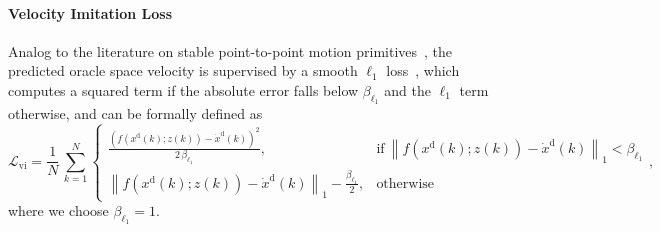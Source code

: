 \paragraph{Velocity Imitation Loss}
Analog to the literature on stable point-to-point motion primitives~\citep{rana2020euclideanizing}, the predicted oracle space velocity is supervised by a smooth $\ell_1$ loss~\citep{girshick2015fast}, which computes a squared term if the absolute error falls below $\beta_{\ell_1}$ and the $\ell_1$ term otherwise, and can be formally defined as
\begin{equation}
    \mathcal{L}_\mathrm{vi} = \frac{1}{N} \, \sum_{k = 1}^{N} \begin{cases}
		\frac{\left ( f(x^\mathrm{d}(k);z(k)) - \dot{x}^\mathrm{d}(k) \right )^2}{2 \, \beta_{\ell_1}}, & \text{if} \: \left \lVert f(x^\mathrm{d}(k);z(k)) - \dot{x}^\mathrm{d}(k) \right \rVert_1 < \beta_{\ell_1} \\
        \left \lVert f(x^\mathrm{d}(k);z(k)) - \dot{x}^\mathrm{d}(k) \right \rVert_1 - \frac{\beta_{\ell_1}}{2} , & \text{otherwise}
    \end{cases},
\end{equation}
where we choose $\beta_{\ell_1} = 1$.

